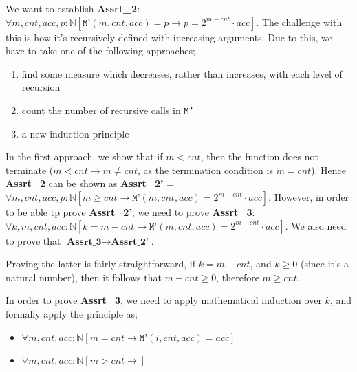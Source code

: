 \documentclass[a4paper, 12pt]{article}
\begin{document}
            We want to establish \textbf{Assrt\_2}: $\forall m, cnt, acc, p : \mathbb{N} [\texttt{M'}(m, cnt, acc) = p \rightarrow p = 2^{m - cnt} \cdot acc]$. The challenge with this is how it's recursively defined with increasing arguments. Due to this, we have to take one of the following approaches;
            \begin{enumerate}[1.]
                \itemsep0em
                \item find some measure which decreases, rather than increases, with each level of recursion
                \item count the number of recursive calls in \texttt{M'}
                \item a new induction principle
            \end{enumerate}
            In the first approach, we show that if $m < cnt$, then the function does not terminate ($m < cnt \rightarrow m \neq cnt$, as the termination condition is $m = cnt$). Hence \textbf{Assrt\_2} can be shown as \textbf{Assrt\_2'} = $\forall m, cnt, acc, p : \mathbb{N} [m \geq cnt \rightarrow \texttt{M'}(m, cnt, acc) = 2^{m - cnt} \cdot acc]$. However, in order to be able tp prove \textbf{Assrt\_2'}, we need to prove \textbf{Assrt\_3}: $\forall k, m, cnt, acc : \mathbb{N} [k = m - cnt \rightarrow \texttt{M'}(m, cnt, acc) = 2^{m - cnt} \cdot acc]$. We also need to prove that $\textbf{Assrt\_3} \rightarrow \textbf{Assrt\_2'}$.
            \medskip

            Proving the latter is fairly straightforward, if $k = m - cnt$, and $k \geq 0$ (since it's a natural number), then it follows that $m - cnt \geq 0$, therefore $m \geq cnt$.
            \medskip

            In order to prove \textbf{Assrt\_3}, we need to apply mathematical induction over $k$, and formally apply the principle as;
            \smallskip

            \begin{itemize}
                \itemsep0em
                \item $\forall m, cnt, acc : \mathbb{N} [m = cnt \rightarrow \texttt{M'}(i, cnt, acc) = acc]$
                \item $\forall m, cnt, acc : \mathbb{N} [m > cnt \rightarrow ]$
            \end{itemize}
\end{document}
